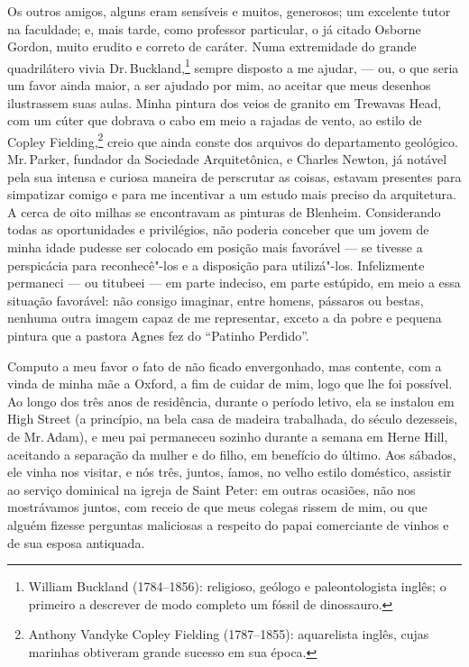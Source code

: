 Os outros amigos, alguns eram sensíveis e muitos, generosos; um
excelente tutor na faculdade; e, mais tarde, como professor particular,
o já citado Osborne Gordon, muito erudito e correto de caráter. Numa
extremidade do grande quadrilátero vivia Dr.\,Buckland,\footnote{William
  Buckland (1784--1856): religioso, geólogo e paleontologista inglês; o
  primeiro a descrever de modo completo um fóssil de dinossauro.} sempre disposto a me ajudar, --- ou, o que seria um favor
ainda maior, a ser ajudado por mim, ao aceitar que meus desenhos
ilustrassem suas aulas. Minha pintura dos veios de granito em Trewavas
Head, com um cúter que dobrava o cabo em meio a rajadas de vento, ao
estilo de Copley Fielding,\footnote{Anthony Vandyke Copley Fielding
  (1787--1855): aquarelista inglês, cujas marinhas obtiveram grande
  sucesso em sua época.} creio que ainda conste dos
arquivos do departamento geológico. Mr.\,Parker, fundador da Sociedade
Arquitetônica, e Charles Newton, já notável pela sua intensa e curiosa
maneira de perscrutar as coisas, estavam presentes para simpatizar
comigo e para me incentivar a um estudo mais preciso da arquitetura. A
cerca de oito milhas se encontravam as pinturas de Blenheim.
Considerando todas as oportunidades e privilégios, não poderia conceber
que um jovem de minha idade pudesse ser colocado em posição mais
favorável --- se tivesse a perspicácia para reconhecê"-los e a disposição
para utilizá"-los. Infelizmente permaneci --- ou titubeei --- em parte
indeciso, em parte estúpido, em meio a essa situação favorável: não
consigo imaginar, entre homens, pássaros ou bestas, nenhuma outra imagem
capaz de me representar, exceto a da pobre e pequena pintura que a
pastora Agnes fez do ``Patinho Perdido''.

Computo a meu favor o fato de não ficado envergonhado, mas
contente, com a vinda de minha mãe a Oxford, a fim de cuidar de mim,
logo que lhe foi possível. Ao longo dos três anos de residência, durante
o período letivo, ela se instalou em High Street (a princípio, na bela
casa de madeira trabalhada, do século dezesseis, de Mr.\,Adam), e meu pai
permaneceu sozinho durante a semana em Herne Hill, aceitando a separação
da mulher e do filho, em benefício do último. Aos sábados, ele vinha nos
visitar, e nós três, juntos, íamos, no velho estilo doméstico, assistir
ao serviço dominical na igreja de Saint Peter: em outras ocasiões, não
nos mostrávamos juntos, com receio de que meus colegas rissem de mim, ou
que alguém fizesse perguntas maliciosas a respeito do papai comerciante
de vinhos e de sua esposa antiquada.


